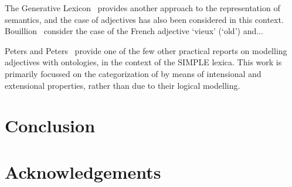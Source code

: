 \documentclass[11pt]{article}
\begin{document}
The Generative Lexicon~\cite{pustejovsky1991generative} provides another approach to the representation of semantics, and the case of adjectives has also been considered in this context. Bouillion~ consider the case of the French adjective `vieux' (`old') and...

Peters and Peters~ provide one of the few other practical reports on modelling adjectives with ontologies, in the context of the SIMPLE lexica. This work is primarily focussed on the categorization of by means of intensional and extensional properties, rather than due to their logical modelling. 

\section{Conclusion}

\section*{Acknowledgements}



\end{document}
